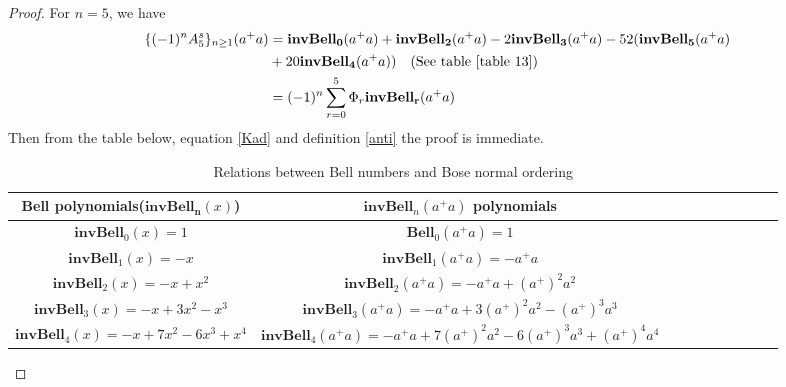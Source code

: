 \documentclass[pdflatex,sn-mathphys-num]{sn-jnl}%
\theoremstyle{thmstyleone}%
\theoremstyle{thmstyletwo}%
\theoremstyle{thmstylethree}%
\begin{document}
\begin{proof}
    For $n=5$, we have 
    \begin{align*}
        \lbrace(-1)^n A_5^s\rbrace_{n\geq 1}(a^{\mathbb{+}}a)&=\mathbf{invBell_0}(a^{\mathbb{+}}a) + \mathbf{invBell_2}(a^{\mathbb{+}}a)-2 \mathbf{invBell_3}(a^{\mathbb{+}}a)  - 52 (\mathbf{invBell_5}(a^{\mathbb{+}}a) \\
        &+ 20\mathbf{invBell_4}(a^{\mathbb{+}}a))   \quad (\mbox{See table \ref{table 13}})  \\
        &=(-1)^n\sum_{r=0}^{5} \Phi_r \mathbf{invBell_r}(a^{\mathbb{+}}a)
    \end{align*}
Then from the table below, equation \ref{Kad} and definition \ref{anti} the proof is immediate. 
\begin{table}[!ht]
    \centering
    \begin{tabular}{|c|c|c|c|c|a|c|c|c|c|}\hline 
        Bell polynomials($\mathbf{invBell_n}(x)$)&$\mathbf{invBell}_n(a^{\mathbb{+}}a)$ polynomials  \\\hline 
         $\mathbf{invBell}_0(x) = 1$ &$\mathbf{Bell}_0(a^{\mathbb{+}}a) = 1$\\\hline
        $\mathbf{invBell}_1(x) = -x$ &$\mathbf{invBell}_1(a^{\mathbb{+}}a) =  -a^{\mathbb{+}}a$ \\\hline
          $\mathbf{invBell}_2(x) = -x+x^2$ & $\mathbf{invBell}_2(a^{\mathbb{+}}a)  = -a^{\mathbb{+}}a+(a^{\mathbb{+}})^2 a^2$ \\\hline
            $\mathbf{invBell}_3(x) = -x+3x^2-x^3$ & $\mathbf{invBell}_3(a^{\mathbb{+}}a) =-a^{\mathbb{+}}a+3(a^{\mathbb{+}})^2 a^2 -(a^{\mathbb{+}})^3 a^3$ \\\hline
              $\mathbf{invBell}_4(x) = -x+7x^2-6x^3+x^4$  & $\mathbf{invBell}_4(a^{\mathbb{+}}a) = -a^{\mathbb{+}}a+7(a^{\mathbb{+}})^2 a^2-6(a^{\mathbb{+}})^3 a^3+ (a^{\mathbb{+}})^4 a^4$ \\\hline
    \end{tabular}
    \caption{Relations between Bell numbers and Bose normal ordering \cite{OEIS:A003422} }
    \label{table 13}
\end{table}
\end{proof}
\end{document}
